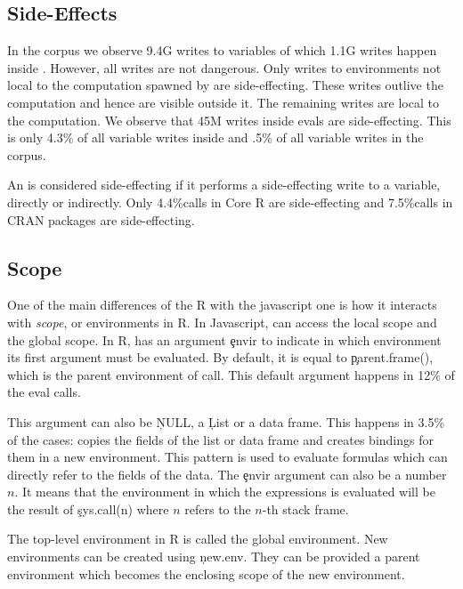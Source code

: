 \documentclass[conference]{IEEEtran}
\newcommand{\AllWritesRnd}{9.4G\xspace}
\newcommand{\EvalWritesRnd}{1.1G\xspace}
\newcommand{\EvalSideEffectingWritesRnd}{45M\xspace}
\newcommand{\EvalSideEffectingWritesEvalPerc}{4.3\%\xspace}
\newcommand{\EvalSideEffectingWritesAllPerc}{.5\%\xspace}
\newcommand{\SideEffectingCoreCallPerc}{4.4\%\xspace}
\newcommand{\SideEffectingPackageCallPerc}{7.5\%\xspace}
\newcommand{\DefaultEnvirExprPercent}{12\%\xspace}
\begin{document}
\subsection{Side-Effects}

In the corpus we observe \AllWritesRnd writes to variables of which
\EvalWritesRnd writes happen inside \eval. However, all writes are not
dangerous. Only writes to environments not local to the computation spawned
by \eval are side-effecting. These writes outlive the computation and hence
are visible outside it. The remaining writes are local to the
computation. We observe that \EvalSideEffectingWritesRnd writes inside evals
are side-effecting. This is only \EvalSideEffectingWritesEvalPerc of all
variable writes inside \eval and \EvalSideEffectingWritesAllPerc of all
variable writes in the corpus.

An \eval is considered side-effecting if it performs a side-effecting write to a
variable, directly or indirectly. Only \SideEffectingCoreCallPerc \eval calls in
Core R are side-effecting and \SideEffectingPackageCallPerc \eval calls in CRAN
packages are side-effecting.

\subsection{Scope}

One of the main differences of the R \eval with the javascript one is how it
interacts with \emph{scope}, or environments in R. In Javascript, \eval can
access the local scope and the global scope. In R, \eval has an argument
\c{envir} to indicate in which environment its first argument must be evaluated.
By default, it is equal to \c{parent.frame()}, 
which is the parent environment of \eval call. This default argument
happens in \DefaultEnvirExprPercent of the eval calls.

This argument can also be \c{NULL}, a \c{List} or a data frame. This happens
in 3.5\% of the cases: \eval copies the fields of the list or data frame
and creates bindings for them in a new environment. This pattern is used to
evaluate formulas which can directly refer to the fields of the data.  The
\c{envir} argument can also be a number $n$. It means that the environment
in which the expressions is evaluated will be the result of \c{sys.call(n)}
where $n$ refers to the $n$-th stack frame.

The top-level environment in R is called the global environment. New
environments can be created using \c{new.env}. They can be provided a parent
environment which becomes the enclosing scope of the new environment.
\end{document}
